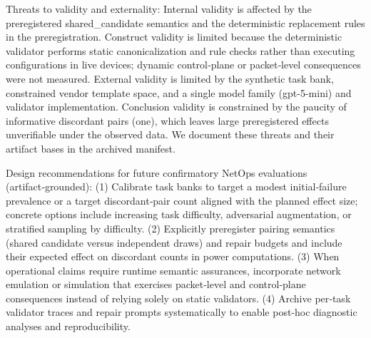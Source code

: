 \documentclass[conference]{IEEEtran}
\begin{document}
Threats to validity and externality: Internal validity is affected by the preregistered shared\_candidate semantics and the deterministic replacement rules in the preregistration. Construct validity is limited because the deterministic validator performs static canonicalization and rule checks rather than executing configurations in live devices; dynamic control‑plane or packet‑level consequences were not measured. External validity is limited by the synthetic task bank, constrained vendor template space, and a single model family (gpt-5-mini) and validator implementation. Conclusion validity is constrained by the paucity of informative discordant pairs (one), which leaves large preregistered effects unverifiable under the observed data. We document these threats and their artifact bases in the archived manifest.

Design recommendations for future confirmatory NetOps evaluations (artifact‑grounded): (1) Calibrate task banks to target a modest initial‑failure prevalence or a target discordant‑pair count aligned with the planned effect size; concrete options include increasing task difficulty, adversarial augmentation, or stratified sampling by difficulty. (2) Explicitly preregister pairing semantics (shared candidate versus independent draws) and repair budgets and include their expected effect on discordant counts in power computations. (3) When operational claims require runtime semantic assurances, incorporate network emulation or simulation that exercises packet‑level and control‑plane consequences instead of relying solely on static validators. (4) Archive per‑task validator traces and repair prompts systematically to enable post‑hoc diagnostic analyses and reproducibility.
\end{document}
